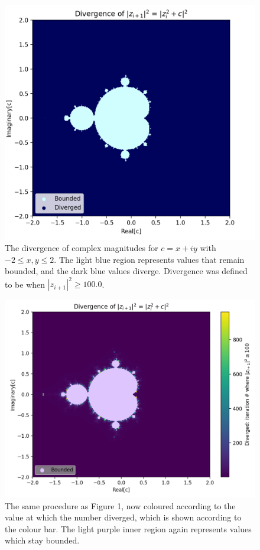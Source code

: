 \documentclass[12pt]{article}
\begin{document}
\begin{figure}
    \centering
    \includegraphics[scale=0.80]{Q1plot3_CITA200HA2.png}
    \caption{The divergence of complex magnitudes for $c = x + iy$ with $-2\leq x,y \leq 2$. The light blue region represents values that remain bounded, and the dark blue values diverge. Divergence was defined to be when $|z_{i+1}|^2 \geq 100.0$.}
    \label{fig:my_label}
\end{figure}

\begin{figure}
    \centering
    \includegraphics[scale=0.73]{Q1plot1_CITA200HA2.png}
    \caption{The same procedure as Figure 1, now coloured according to the value at which the number diverged, which is shown according to the colour bar. The light purple inner region again represents values which stay bounded.}
    \label{fig:my_label}
\end{figure}
\end{document}
